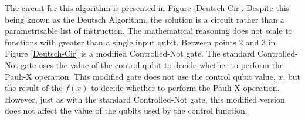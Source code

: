 The circuit for this algorithm is presented in Figure \ref{Deutsch-Cir}.
Despite this being known as the Deutsch Algorithm, the solution is a circuit rather than a parametrisable list of instruction.
The mathematical reasoning does not scale to functions with greater than a single input qubit.
Between points $2$ and $3$ in Figure \ref{Deutsch-Cir} is a modified Controlled-Not gate.
The standard Controlled-Not gate uses the value of the control qubit to decide whether to perform the Pauli-X operation.
This modified gate does not use the control qubit value, $x$, but the result of the $f(x)$ to decide whether to perform the Pauli-X operation.
However, just as with the standard Controlled-Not gate, this modified version does not affect the value of the qubits used by the control function.

% 
% 
